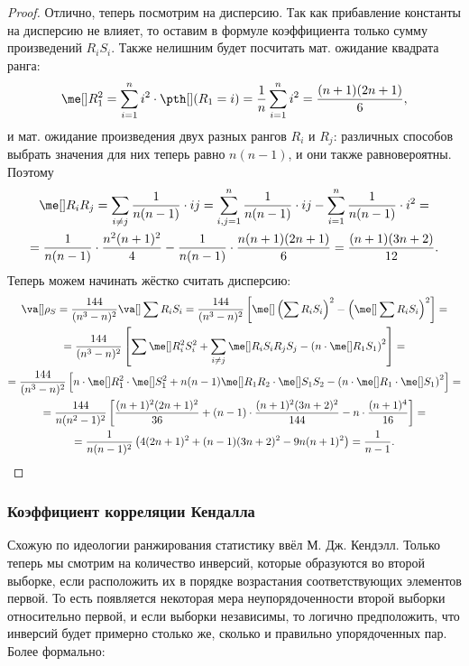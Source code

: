 \begin{proof}
Отлично, теперь посмотрим на дисперсию. Так как прибавление константы на дисперсию не влияет, то оставим в формуле коэффициента только сумму произведений $R_iS_i$. Также нелишним будет посчитать мат. ожидание квадрата ранга:
\[
\me[]R_1^2 = \sum_{i=1}^n i^2\cdot \pth[](R_1 = i) = \frac{1}{n} \sum_{i=1}^n i^2 = \frac{(n+1)(2n+1)}{6},
\]
и мат. ожидание произведения двух разных рангов $R_i$ и $R_j$: различных способов выбрать значения для них теперь равно $n(n-1)$, и они также равновероятны. Поэтому
\begin{gather*}
    \me[]R_iR_j = \sum_{i\ne j} \frac{1}{n(n-1)} \cdot ij = \sum_{i, j=1}^n \frac{1}{n(n-1)} \cdot ij - \sum_{i=1}^n \frac{1}{n(n-1)} \cdot i^2 = \\
    =\frac{1}{n(n-1)}\cdot \frac{n^2(n+1)^2}{4} -  \frac{1}{n(n-1)} \cdot \frac{n(n+1)(2n+1)}{6} = \frac{(n+1)(3n+2)}{12}.
\end{gather*}
Теперь можем начинать жёстко считать дисперсию:
\begin{gather*}
    \va[] \rho_S = \frac{144}{(n^3-n)^2} \va[] \sum R_i S_i = \frac{144}{(n^3-n)^2} \left[\me[]\left(\sum R_i S_i\right)^2 - \left(\me[] \sum R_i S_i\right)^2 \right] = \\
    = \frac{144}{(n^3-n)^2} \left[\sum \me[]R_i^2 S_i^2 + \sum_{i\ne j}\me[]R_iS_iR_jS_j - \left(n\cdot\me[] R_1 S_1\right)^2 \right] = \\
    = \frac{144}{(n^3-n)^2} \left[n\cdot\me[]R_1^2 \cdot\me[]S_1^2 + n(n-1)\me[]R_1R_2\cdot \me[]S_1S_2 - \left(n\cdot\me[] R_1 \cdot \me[]S_1\right)^2 \right] =\\
    = \frac{144}{n(n^2-1)^2} \left[\frac{(n+1)^2(2n+1)^2}{36} + (n-1)\cdot \frac{(n+1)^2(3n+2)^2}{144} - n\cdot\frac{(n+1)^4}{16}\right] = \\
    = \frac{1}{n(n-1)^2}\left(4(2n+1)^2+(n-1)(3n+2)^2-9n(n+1)^2\right) = \frac{1}{n-1}.
\end{gather*}
\end{proof}



\subsubsection{Коэффициент корреляции Кендалла}

Схожую по идеологии ранжирования статистику ввёл М. Дж. Кендэлл. Только теперь мы смотрим на количество инверсий, которые образуются во второй выборке, если расположить их в порядке возрастания соответствующих элементов первой. То есть появляется некоторая мера неупорядоченности второй выборки относительно первой, и если выборки независимы, то логично предположить, что инверсий будет примерно столько же, сколько и правильно упорядоченных пар. Более формально:

